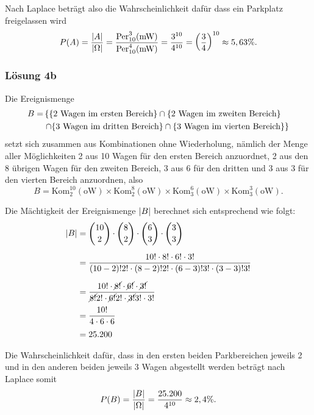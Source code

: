 \documentclass[main.tex]{subfiles}
\begin{document}
Nach Laplace beträgt also die Wahrscheinlichkeit dafür dass ein Parkplatz freigelassen wird
$$
    P(A) = \frac{\abs*{A}}{\abs*{\Omega}} = \frac{\text{Per}^{3}_{10}(\text{mW})}{\text{Per}^{4}_{10}(\text{mW})} = \frac{3^{10}}{4^{10}} = \left(\frac{3}{4}\right)^{10} \approx 5,63\%.
$$

\subsubsection{Lösung 4b}
Die Ereignismenge $$\begin{aligned}
    B = & \left\{
         \set*{\text{2 Wagen im ersten Bereich}}
    \cap \set*{\text{2 Wagen im zweiten Bereich}} \right. \\
    & \left. \cap \set*{\text{3 Wagen im dritten Bereich}}
    \cap \set*{\text{3 Wagen im vierten Bereich}}
\right\}
\end{aligned}$$
setzt sich zusammen aus Kombinationen ohne Wiederholung, nämlich der Menge aller Möglichkeiten 2 aus 10 Wagen für den ersten Bereich anzuordnet, 2 aus den 8 übrigen Wagen für den zweiten Bereich, 3 aus 6 für den dritten und 3 aus 3 für den vierten Bereich anzuordnen, also
$$
    B = \text{Kom}^{10}_{2}(\text{oW})
    \times \text{Kom}^{8}_{2}(\text{oW})
    \times \text{Kom}^{6}_{3}(\text{oW})
    \times \text{Kom}^{3}_{3}(\text{oW}).
$$

Die Mächtigkeit der Ereignismenge $\abs*{B}$ berechnet sich entsprechend wie folgt:
$$\begin{aligned}
    \abs*{B} &= \binom{10}{2} \cdot \binom{8}{2} \cdot \binom{6}{3} \cdot \binom{3}{3} \\[2mm]
    &= \frac{10! \cdot 8! \cdot 6! \cdot 3!}{(10-2)! 2! \cdot (8-2)! 2! \cdot (6-3)! 3! \cdot (3-3)! 3!} \\[2mm]
    &= \frac{10! \cdot \cancel{8!} \cdot \cancel{6!} \cdot \cancel{3!}}{\cancel{8!} 2! \cdot \cancel{6!} 2! \cdot \cancel{3!} 3! \cdot 3!} \\[1mm]
    &= \frac{10!}{4 \cdot 6 \cdot 6} \\[1mm]
    &= 25.200
\end{aligned}$$

Die Wahrscheinlichkeit dafür, dass in den ersten beiden Parkbereichen jeweils 2 und in den anderen beiden jeweils 3 Wagen abgestellt werden beträgt nach Laplace somit
$$\begin{aligned}
    P(B) = \frac{\abs*{B}}{\abs*{\Omega}} = \frac{25.200}{4^{10}} \approx 2,4\%.
\end{aligned}$$
\end{document}

